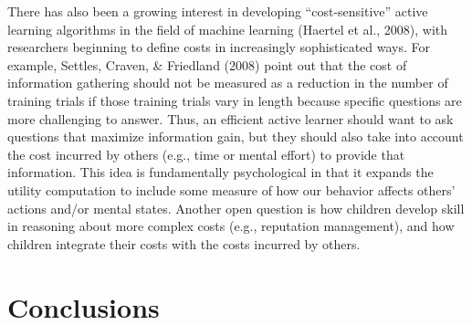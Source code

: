 \documentclass[oneside]{report}
\begin{document}
There has also been a growing interest in developing ``cost-sensitive''
active learning algorithms in the field of machine learning (Haertel et
al., 2008), with researchers beginning to define costs in increasingly
sophisticated ways. For example, Settles, Craven, \& Friedland (2008)
point out that the cost of information gathering should not be measured
as a reduction in the number of training trials if those training trials
vary in length because specific questions are more challenging to
answer. Thus, an efficient active learner should want to ask questions
that maximize information gain, but they should also take into account
the cost incurred by others (e.g., time or mental effort) to provide
that information. This idea is fundamentally psychological in that it
expands the utility computation to include some measure of how our
behavior affects others' actions and/or mental states. Another open
question is how children develop skill in reasoning about more complex
costs (e.g., reputation management), and how children integrate their
costs with the costs incurred by others.

\hypertarget{conclusions}{%
\section{Conclusions}\label{conclusions}}
\end{document}
